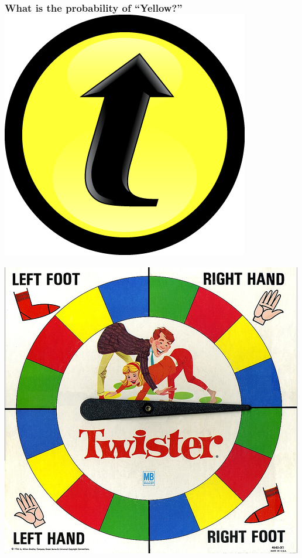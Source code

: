 \documentclass[handout]{beamer}
\begin{document}
\begin{frame}
\frametitle{What is the probability of ``Yellow?''\hfill \includegraphics[scale = 0.05]{./images/clicker}}
\centering
	\includegraphics[scale = 0.6]{./images/twister}

\end{frame}
\end{document}

